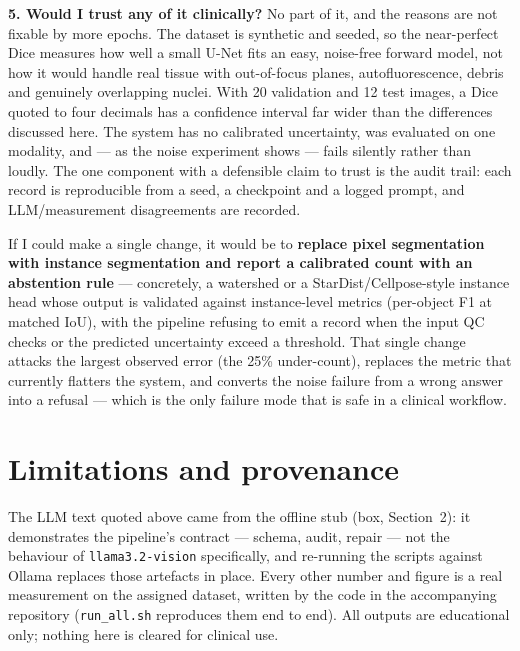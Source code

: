 \documentclass[a4paper,9pt,twocolumn]{extarticle}
\begin{document}
\textbf{5. Would I trust any of it clinically?} No part of it, and the reasons are not
fixable by more epochs. The dataset is synthetic and seeded, so the near-perfect
Dice measures how well a small U-Net fits an easy, noise-free forward model, not
how it would handle real tissue with out-of-focus planes, autofluorescence,
debris and genuinely overlapping nuclei. With 20 validation and 12 test images,
a Dice quoted to four decimals has a confidence interval far wider than the
differences discussed here. The system has no calibrated uncertainty, was
evaluated on one modality, and --- as the noise experiment shows --- fails
silently rather than loudly. The one component with a defensible claim to trust
is the audit trail: each record is reproducible from a seed, a checkpoint and a
logged prompt, and LLM/measurement disagreements are recorded.

If I could make a single change, it would be to \textbf{replace pixel
segmentation with instance segmentation and report a calibrated count with an
abstention rule} --- concretely, a watershed or a StarDist/Cellpose-style
instance head \cite{schmidt2018,stringer2021} whose output is validated against
instance-level metrics (per-object F1 at matched IoU), with the pipeline
refusing to emit a record when the input QC checks or the predicted uncertainty
exceed a threshold. That single change attacks the largest observed error (the
25\% under-count), replaces the metric that currently flatters the system, and
converts the noise failure from a wrong answer into a refusal --- which is the
only failure mode that is safe in a clinical workflow.

\section*{Limitations and provenance}
The LLM text quoted above came from the offline stub (box, Section~2): it
demonstrates the pipeline's contract --- schema, audit, repair --- not the
behaviour of \texttt{llama3.2-vision} specifically, and re-running the scripts
against Ollama replaces those artefacts in place. Every other number and figure
is a real measurement on the assigned dataset, written by the code in the
accompanying repository (\texttt{run\_all.sh} reproduces them end to end). All
outputs are educational only; nothing here is cleared for clinical use.
\end{document}
